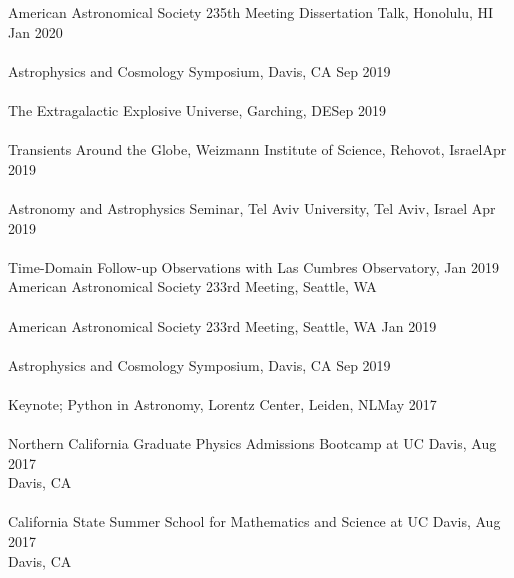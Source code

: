\documentclass[10pt]{cv}
\begin{document}
\begin{llist}
American Astronomical Society 235th Meeting Dissertation Talk, Honolulu, HI \hfill Jan 2020\\ \vspace{-0.1in} 
\\
Astrophysics and Cosmology Symposium, Davis, CA \hfill Sep 2019\\\vspace{-0.1in}  
\\
The Extragalactic Explosive Universe, Garching, DE\hfill Sep 2019\\ \vspace{-0.1in}  
\\
Transients Around the Globe, Weizmann Institute of Science, Rehovot, Israel\hfill Apr 2019\\ \vspace{-0.1in}  %
\\
Astronomy and Astrophysics Seminar, Tel Aviv University, Tel Aviv, Israel \hfill Apr 2019\\ \vspace{-0.1in}  %
\\
Time-Domain Follow-up Observations with Las Cumbres Observatory,   \hfill Jan 2019\\ 
American Astronomical Society 233rd Meeting, Seattle, WA \\ \vspace{-0.1in}  %
\\
American Astronomical Society 233rd Meeting,  Seattle, WA \hfill Jan 2019\\\vspace{-0.1in}  
\\
Astrophysics and Cosmology Symposium, Davis, CA \hfill Sep 2019\\\vspace{-0.1in}  
\\
Keynote; Python in Astronomy, Lorentz Center, Leiden, NL\hfill May 2017\\ \vspace{-0.1in}  %
\\
Northern California Graduate Physics Admissions Bootcamp at UC Davis, \hfill Aug 2017\\ 
Davis, CA\\ \vspace{-0.1in}  %
\\
California State Summer School for Mathematics and Science at UC Davis, \hfill Aug 2017\\ 
 Davis, CA \\ \vspace{-0.1in}  %

\end{llist}
\end{document}
